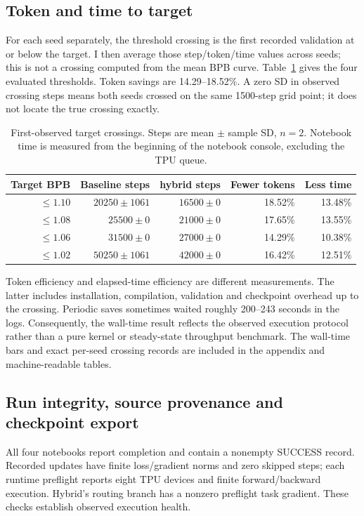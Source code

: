\documentclass[10pt,a4paper]{article}
\begin{document}
\subsection{Token and time to target}
For each seed separately, the threshold crossing is the first recorded validation at
or below the target. I then average those step/token/time values across seeds; this
is not a crossing computed from the mean BPB curve. Table~\ref{tab:efficiency} gives the
four evaluated thresholds. Token savings are 14.29--18.52\%. A zero SD in observed crossing steps means both seeds
crossed on the same 1500-step grid point; it does not locate the true crossing exactly.

\begin{table}[htbp]\centering\small
\caption{First-observed target crossings. Steps are mean $\pm$ sample SD, $n=2$.
Notebook time is measured from the beginning of the notebook console, excluding the TPU queue.}
\label{tab:efficiency}
\begin{tabular}{rrrrr}\toprule
Target BPB&Baseline steps&hybrid steps&Fewer tokens&Less time\\\midrule
$\leq1.10$&$20250\pm1061$&$16500\pm0$&18.52\%&13.48\%\\
$\leq1.08$&$25500\pm0$&$21000\pm0$&17.65\%&13.55\%\\
$\leq1.06$&$31500\pm0$&$27000\pm0$&14.29\%&10.38\%\\
$\leq1.02$&$50250\pm1061$&$42000\pm0$&16.42\%&12.51\%\\\bottomrule
\end{tabular}\end{table}

Token efficiency and elapsed-time efficiency are different measurements. The latter
includes installation, compilation, validation and checkpoint overhead up to the crossing.
Periodic saves sometimes waited roughly 200--243 seconds in the logs. Consequently,
the wall-time result reflects the observed execution protocol rather than a pure kernel
or steady-state throughput benchmark. The wall-time bars and exact per-seed crossing
records are included in the appendix and machine-readable tables.

\subsection{Run integrity, source provenance and checkpoint export}
All four notebooks report completion and contain a nonempty SUCCESS record. Recorded
updates have finite loss/gradient norms and zero skipped steps; each runtime preflight
reports eight TPU devices and finite forward/backward execution. Hybrid's routing branch
has a nonzero preflight task gradient. These checks establish observed execution health.
\end{document}
